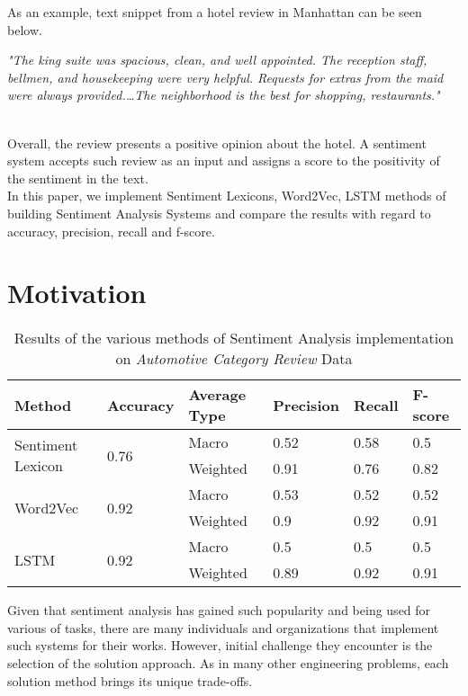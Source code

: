 \documentclass[11pt,a4paper]{article}
\begin{document}
As an example, text snippet from a hotel review in Manhattan can be seen below.\\

\parbox{0.45\textwidth}{
	\centering
	\small
	\textit{
		"The king suite was spacious, clean, and well appointed. The reception staff, bellmen, and housekeeping were very helpful. Requests for extras from the maid were always provided.\ldots The neighborhood is the best for shopping, restaurants." \cite{ronen}
	}
}\\

Overall, the review presents a positive opinion about the hotel. A sentiment system accepts such review as an input and assigns a score to the positivity of the sentiment in the text. \\

In this paper, we implement Sentiment Lexicons, Word2Vec, LSTM methods of building Sentiment Analysis Systems and compare the results with regard to accuracy, precision, recall and f-score. 


\section{Motivation}

\begin{table*}[ht]
	\centering
	\begin{tabular}{|l|l|l|l|l|l|}
		\hline
		\textbf{Method} & \textbf{Accuracy} & \textbf{Average Type} & \textbf{Precision} & \textbf{Recall} & \textbf{F-score} \\ \hline
		\multirow{2}{*}{Sentiment Lexicon} & \multirow{2}{*}{0.76} & Macro & 0.52 & 0.58 & 0.5 \\ \cline{3-6}
		& & Weighted & 0.91 & 0.76 & 0.82 \\ \hline
		\multirow{2}{*}{Word2Vec} & \multirow{2}{*}{0.92} & Macro & 0.53 & 0.52 & 0.52\\ \cline{3-6}
		& & Weighted & 0.9 & 0.92 & 0.91 \\ \hline
		\multirow{2}{*}{LSTM} & \multirow{2}{*}{0.92} & Macro & 0.5 & 0.5 & 0.5 \\ \cline{3-6}
		& & Weighted & 0.89 & 0.92 & 0.91 \\ \hline  
	\end{tabular}
\caption{Results of the various methods of Sentiment Analysis implementation on \textit{Automotive Category Review} Data}
\end{table*}

Given that sentiment analysis has gained such popularity and being used for various of tasks, there are many individuals and organizations that implement such systems for their works. However, initial challenge they encounter is the selection of the solution approach. As in many other engineering problems, each solution method brings its unique trade-offs. \\
\end{document}
